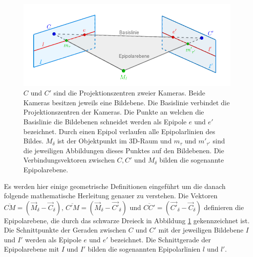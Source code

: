 \begin{figure}[!htb]
	\centering
	\includegraphics[width=.8\linewidth]{images/EpipolarGeoemtrieGrafik_beschriftet.png}
	\caption[Epipolar Geometrie]{$C$ und $C'$ sind die Projektionszentren zweier Kameras. Beide Kameras besitzen jeweils eine Bildebene. Die Basislinie verbindet die Projektionszentren der Kameras. Die Punkte an welchen die Basislinie die Bildebenen schneidet werden als Epipole $e$ und $e'$ bezeichnet. Durch einen Epipol verlaufen alle Epipolarlinien des Bildes. $M_\delta$ ist der Objektpunkt im 3D-Raum und $m_\tau$ und $m'_{\tau'}$ sind die jeweiligen Abbildungen dieses Punktes auf den Bildebenen. Die Verbindungsvektoren zwischen $C, C'$ und $M_\delta$ bilden die sogenannte Epipolarebene\cite{Hoffmann,phdTwoView,HZ,ZZGXr}.}  
	\label{fig:Epipolargeometry}
\end{figure}



Es werden hier einige geometrische Definitionen eingeführt um die danach folgende mathematische Herleitung genauer zu verstehen. Die Vektoren $\overline{CM} = (\overrightarrow{M}_\delta - \overrightarrow{C}_\delta),\, \overline{C'M} = (\overrightarrow{M}_\delta - \overrightarrow{C'}_\delta)$ und $\overline{CC'} = (\overrightarrow{C'}_\delta - \overrightarrow{C}_\delta)$ definieren die Epipolarebene, die durch das schwarze Dreieck in Abbildung \ref{fig:Epipolargeometry} gekennzeichnet ist. Die Schnittpunkte der Geraden zwischen $C$ und $C'$ mit der jeweiligen Bildebene $I$ und $I'$ werden als Epipole $e$ und $e'$ bezeichnet. Die Schnittgerade der Epipolarebene mit $I$ und $I'$ bilden die sogenannten Epipolarlinien $l$ und $l'$\cite{HZ,Zhang2014,ZZPaper,phdTwoView,Elements}.\\%

